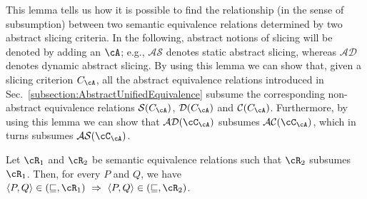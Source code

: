 \documentclass[prodmode,acmtocl]{acmsmall}
\newcommand{\LLL}{\mathbb{L}}
\newcommand{\VV}{\mathsf{V}}
\newcommand{\PP}{\mathsf{P}}
\newcommand{\AAA}{\mathsf{A}}
\newcommand{\SSS}{\mathsf{S}}
\newcommand{\XX}{\mathsf{L}}
\newenvironment{nomedef}
{\rm\bfseries}
{}
\newcommand{\defthename}[1]{\begin{nomedef}(#1)\quad\!\!\!\end{nomedef}}
\def\prog{\ensuremath{P}\xspace}
\def\progq{\ensuremath{Q}\xspace}
\def\crit{\ensuremath{C}\xspace}
\def\uco{\ensuremath{\rho}\xspace}
\def\UEA{\ensuremath{\mathcal{U}^{\mathcal{A}}}}
\newcommand{\Ra}{\Rightarrow}
\newcommand{\COMMENT} [1]{}
\def\tuple#1{\langle #1 \rangle}
\newcommand{\0}{\mbox{\bf 0}}
\begin{document}
\COMMENT{
\begin{lemma}
  \label{the:AbstractUnifiedEquivalenceLemma}
  \defthename{$\UEA$-lemma} Let $\SSS_1$ and $\SSS_2$ be sets of
  initial memory states, $\VV_1$ and $\VV_2$ be sets of variables,
  $\PP_1$ and $\PP_2$ be sets of occurrences, $\XX_1$ and $\XX_2$ be
  functions from pairs of sets of line numbers to sets of line
  numbers, and $\AAA_1$ and $\AAA_2$ be partial functions from line
  numbers and variables to properties on variables, such that $\SSS_1
  \subseteq \SSS_2$, $\PP_1 \subseteq \PP_2$, $\VV_1 \subseteq \VV_2$,
  $\forall P, Q.\:\XX_1(\overline{P}, \overline{Q}) \subseteq
  \XX_2(\overline{P}, \overline{Q})$ and $\forall i \in C_1, x \in
  \VV_1.\:\AAA_2(i, x) \overline{\sqsubseteq} \AAA_1(i, x)$, where
  $C_1 = \{n \in \LLL \mid \exists k \in \mathbb{N}.(n, k) \in
  \PP_1\}$, and $\overline{\sqsubseteq}$ is the relation "more
  concrete than" in the lattice of abstract interpretations
  \footnote{Given the abstractions $\phi_{1}$ and $\phi_{2}$ modeled
    as \uco{}s, $\phi_{1}\overline{\sqsubseteq}\phi_{2}$ iff $\forall
    x.\:\phi_{1}(x)\leq\phi_{2}(x)$.}, then $P\quad\!\!\!\UEA(\SSS_2,
  \VV_2, \PP_2, \XX_2, \AAA_2)\quad\!\!\!Q \Rightarrow
  P\quad\!\!\!\UEA(\SSS_1, \VV_1, \PP_1, \XX_1, \AAA_1)\quad\!\!\!Q$.
\end{lemma}}

This lemma tells us how it is possible to find the relationship (in
the sense of subsumption) between two semantic equivalence relations
determined by two abstract slicing criteria.  In the following,
abstract notions of slicing will be denoted by adding an $\cA$; e.g.,
$\mathcal{AS}$ denotes static abstract slicing, whereas $\mathcal{AD}$
denotes dynamic abstract slicing.  By using this lemma we can show
that, given a slicing criterion $\crit_{\cA}$, all the abstract
equivalence relations introduced in
Sec.~\ref{subsection:AbstractUnifiedEquivalence} subsume the
corresponding non-abstract equivalence relations
$\mathcal{S}(\crit_{\cA})$, $\mathcal{D}(\crit_{\cA})$ and
$\mathcal{C}(\crit_{\cA})$.  Furthermore, by using this lemma we can
show that $\mathcal{AD}(\cC_{\cA})$ subsumes
$\mathcal{AC}(\cC_{\cA})$, which in turns subsumes
$\mathcal{AS}(\cC_{\cA})$.

\begin{theorem}
  \cite{TheoFoun} Let $\cR_{1}$ and $\cR_{2}$ be semantic equivalence
  relations such that $\cR_{2}$ subsumes $\cR_{1}$.  Then, for every
  $\prog$ and $\progq$, we have $\tuple{\prog,\progq} \in
  (\sqsubseteq,\cR_{1})~ \Ra~\tuple{\prog,\progq} \in
  (\sqsubseteq,\cR_{2})$.
\end{theorem}
\end{document}
